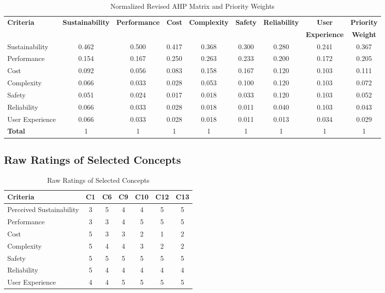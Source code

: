 \documentclass[12pt]{article}
\begin{document}
\begin{landscape}
\begin{table}[h!]
\centering
\caption{Normalized Revised AHP Matrix and Priority Weights}
\label{tab:normalized_revised_ahp}
\begin{tabular}{l c c c c c c c c}
\toprule
\textbf{Criteria} & \textbf{Sustainability} & \textbf{Performance} & \textbf{Cost} & \textbf{Complexity} & \textbf{Safety} & \textbf{Reliability} & \textbf{User} & \textbf{Priority} \\
 &  &  &  &  &  &  & \textbf{Experience} & \textbf{Weight} \\
\midrule
Sustainability & 0.462 & 0.500 & 0.417 & 0.368 & 0.300 & 0.280 & 0.241 & 0.367 \\
Performance & 0.154 & 0.167 & 0.250 & 0.263 & 0.233 & 0.200 & 0.172 & 0.205 \\
Cost & 0.092 & 0.056 & 0.083 & 0.158 & 0.167 & 0.120 & 0.103 & 0.111 \\
Complexity & 0.066 & 0.033 & 0.028 & 0.053 & 0.100 & 0.120 & 0.103 & 0.072 \\
Safety & 0.051 & 0.024 & 0.017 & 0.018 & 0.033 & 0.120 & 0.103 & 0.052 \\
Reliability & 0.066 & 0.033 & 0.028 & 0.018 & 0.011 & 0.040 & 0.103 & 0.043 \\
User Experience & 0.066 & 0.033 & 0.028 & 0.018 & 0.011 & 0.013 & 0.034 & 0.029 \\
\midrule
\textbf{Total} & 1 & 1 & 1 & 1 & 1 & 1 & 1 & 1 \\
\bottomrule
\end{tabular}
\end{table}
\end{landscape}

\subsection*{Raw Ratings of Selected Concepts}

\begin{table}[h!]
\centering
\caption{Raw Ratings of Selected Concepts}
\label{tab:revised_raw_ratings}
\begin{tabular}{l c c c c c c}
\toprule
\textbf{Criteria} & \textbf{C1} & \textbf{C6} & \textbf{C9} & \textbf{C10} & \textbf{C12} & \textbf{C13} \\
\midrule
Perceived Sustainability & 3 & 5 & 4 & 4 & 5 & 5 \\
Performance              & 3 & 3 & 4 & 5 & 5 & 5 \\
Cost                     & 5 & 3 & 3 & 2 & 1 & 2 \\
Complexity               & 5 & 4 & 4 & 3 & 2 & 2 \\
Safety                   & 5 & 5 & 5 & 5 & 5 & 5 \\
Reliability              & 5 & 4 & 4 & 4 & 4 & 4 \\
User Experience          & 4 & 4 & 5 & 5 & 5 & 5 \\
\bottomrule
\end{tabular}
\end{table}
\end{document}
